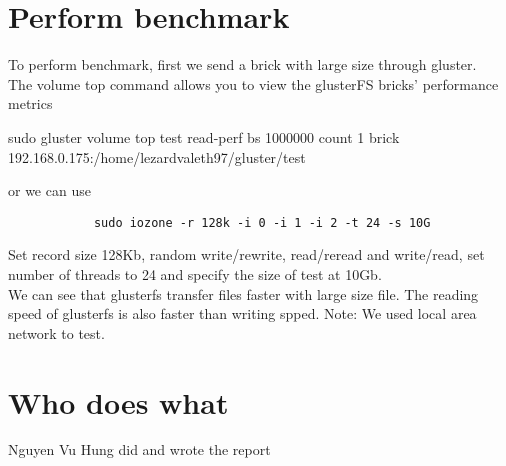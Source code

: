 \documentclass[12pt]{article}
\begin{document}
    \section{Perform benchmark}
    To perform benchmark, first we send a brick with large size through gluster.\\
    The volume top command allows you to view the glusterFS bricks’ performance metrics
     \begin{spverbatim}
            sudo gluster volume top test read-perf bs 1000000 count 1 brick 192.168.0.175:/home/lezardvaleth97/gluster/test
        \end{spverbatim}
        or we can use
        \begin{verbatim}
            sudo iozone -r 128k -i 0 -i 1 -i 2 -t 24 -s 10G
        \end{verbatim}
        Set record size 128Kb, random write/rewrite, read/reread and write/read, set number of threads to 24 and specify the size of test at 10Gb.\\
        We can see that glusterfs transfer files faster with large size file. The reading speed of glusterfs is also faster than writing spped.
        Note: We used local area network to test.
        
    \section{Who does what}
Nguyen Vu Hung did and wrote the report
\end{document}
